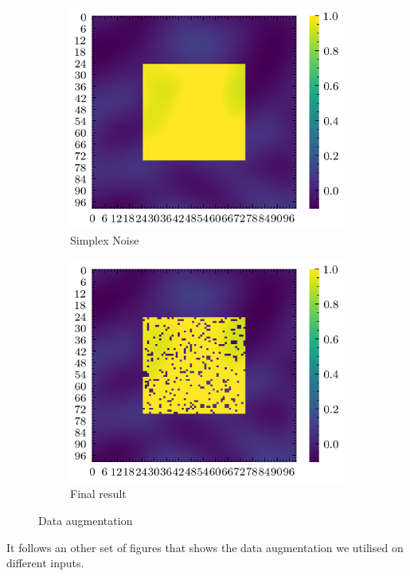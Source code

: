 \documentclass[../document.tex]{subfiles}
\begin{document}
\begin{figure}[H]
          \begin{subfigure}[b]{0.45\textwidth}
            \includegraphics[width=\textwidth]{../img/data-aug/2d/center-simplex.png}
            \caption{Simplex Noise}

        \end{subfigure}    
        \begin{subfigure}[b]{0.45\textwidth}
            \includegraphics[width=\textwidth]{../img/data-aug/2d/center-aug.png}
            \caption{Final result}
        \end{subfigure}    
    \label{fig: square-patch-aug}
    \caption{Data augmentation}    
\end{figure}
It follows an other set of figures that shows the data augmentation we utilised on different inputs.
\end{document}
